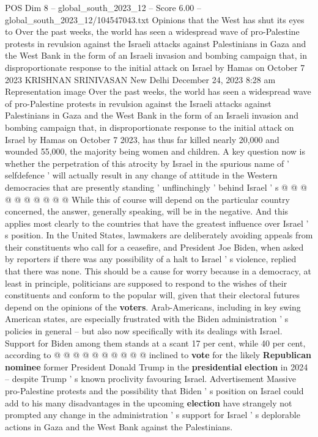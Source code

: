 \begin{textsample}{POS Dim 8 – global\_south\_2023\_12 – Score 6.00 – global\_south\_2023\_12/104547043.txt}  \label{ex:f8_pos_233}
Opinions that the West has shut its eyes to Over the past weeks, the world has seen a widespread wave of pro-Palestine protests in revulsion against the Israeli attacks against Palestinians in Gaza and the West Bank in the form of an Israeli invasion and bombing campaign that, in disproportionate response to the initial attack on Israel by Hamas on October 7 2023 KRISHNAN SRINIVASAN New Delhi December 24, 2023 8:28 am Representation image Over the past weeks, the world has seen a widespread wave of pro-Palestine protests in revulsion against the Israeli attacks against Palestinians in Gaza and the West Bank in the form of an Israeli invasion and bombing campaign that, in disproportionate response to the initial attack on Israel by Hamas on October 7 2023, has thus far killed nearly 20,000 and wounded 55,000, the majority being women and children.
A key question now is whether the perpetration of this atrocity by Israel in the spurious name of ' selfdefence ' will actually result in any change of attitude in the Western democracies that are presently standing ' unflinchingly ' behind Israel ' s @ @ @ @ @ @ @ @ @ @ While this of course will depend on the particular country concerned, the answer, generally speaking, will be in the negative.
And this applies most clearly to the countries that have the greatest influence over Israel ' s position.
In the United States, lawmakers are deliberately avoiding appeals from their constituents who call for a ceasefire, and President Joe Biden, when asked by reporters if there was any possibility of a halt to Israel ' s violence, replied that there was none.
This should be a cause for worry because in a democracy, at least in principle, politicians are supposed to respond to the wishes of their constituents and conform to the popular will, given that their electoral futures depend on the opinions of the \textbf{voters}.
Arab-Americans, including in key swing American states, are especially frustrated with the Biden administration ' s policies in general -- but also now specifically with its dealings with Israel.
Support for Biden among them stands at a scant 17 per cent, while 40 per cent, according to @ @ @ @ @ @ @ @ @ @ inclined to \textbf{vote} for the likely \textbf{Republican} \textbf{nominee} former President Donald Trump in the \textbf{presidential} \textbf{election} in 2024 -- despite Trump ' s known proclivity favouring Israel.
Advertisement Massive pro-Palestine protests and the possibility that Biden ' s position on Israel could add to his many disadvantages in the upcoming \textbf{election} have strangely not prompted any change in the administration ' s support for Israel ' s deplorable actions in Gaza and the West Bank against the Palestinians.

\end{textsample}
